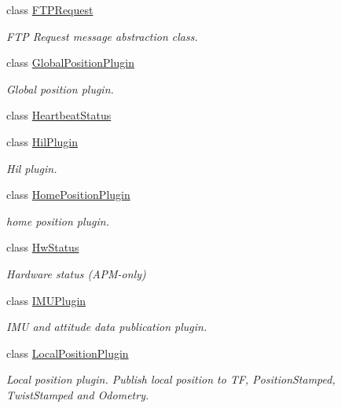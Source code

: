 \begin{DoxyCompactItemize}
class \mbox{\hyperlink{classmavros_1_1std__plugins_1_1FTPRequest}{F\+T\+P\+Request}}
\begin{DoxyCompactList}\small\item\em F\+TP Request message abstraction class. \end{DoxyCompactList}\item 
class \mbox{\hyperlink{classmavros_1_1std__plugins_1_1GlobalPositionPlugin}{Global\+Position\+Plugin}}
\begin{DoxyCompactList}\small\item\em Global position plugin. \end{DoxyCompactList}\item 
class \mbox{\hyperlink{classmavros_1_1std__plugins_1_1HeartbeatStatus}{Heartbeat\+Status}}
\item 
class \mbox{\hyperlink{classmavros_1_1std__plugins_1_1HilPlugin}{Hil\+Plugin}}
\begin{DoxyCompactList}\small\item\em Hil plugin. \end{DoxyCompactList}\item 
class \mbox{\hyperlink{classmavros_1_1std__plugins_1_1HomePositionPlugin}{Home\+Position\+Plugin}}
\begin{DoxyCompactList}\small\item\em home position plugin. \end{DoxyCompactList}\item 
class \mbox{\hyperlink{classmavros_1_1std__plugins_1_1HwStatus}{Hw\+Status}}
\begin{DoxyCompactList}\small\item\em Hardware status (A\+P\+M-\/only) \end{DoxyCompactList}\item 
class \mbox{\hyperlink{classmavros_1_1std__plugins_1_1IMUPlugin}{I\+M\+U\+Plugin}}
\begin{DoxyCompactList}\small\item\em I\+MU and attitude data publication plugin. \end{DoxyCompactList}\item 
class \mbox{\hyperlink{classmavros_1_1std__plugins_1_1LocalPositionPlugin}{Local\+Position\+Plugin}}
\begin{DoxyCompactList}\small\item\em Local position plugin. Publish local position to TF, Position\+Stamped, Twist\+Stamped and Odometry. \end{DoxyCompactList}\item 

\end{DoxyCompactItemize}
